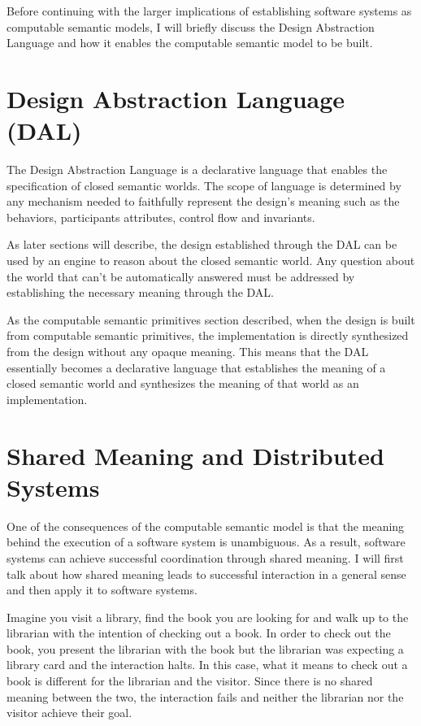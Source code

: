 \documentclass{article}
\begin{document}
Before continuing with the larger implications of establishing software systems as computable semantic models, I will briefly discuss the Design Abstraction Language and how it enables the computable semantic model to be built.

\section{Design Abstraction Language (DAL)}

The Design Abstraction Language is a declarative language that enables the specification of closed semantic worlds. The scope of language is determined by any mechanism needed to faithfully represent the design's meaning such as the behaviors, participants attributes, control flow and invariants.

As later sections will describe, the design established through the DAL can be used by an engine to reason about the closed semantic world. Any question about the world that can’t be automatically answered must be addressed by establishing the necessary meaning through the DAL.

As the computable semantic primitives section described, when the design is built from computable semantic primitives, the implementation is directly synthesized from the design without any opaque meaning. This means that the DAL essentially becomes a declarative language that establishes the meaning of a closed semantic world and synthesizes the meaning of that world as an implementation.

\section{Shared Meaning and Distributed Systems}

One of the consequences of the computable semantic model is that the meaning behind the execution of a software system is unambiguous. As a result, software systems can achieve successful coordination through shared meaning. I will first talk about how shared meaning leads to successful interaction in a general sense and then apply it to software systems.

Imagine you visit a library, find the book you are looking for and walk up to the librarian with the intention of checking out a book. In order to check out the book, you present the librarian with the book but the librarian was expecting a library card and the interaction halts. In this case, what it means to check out a book is different for the librarian and the visitor. Since there is no shared meaning between the two, the interaction fails and neither the librarian nor the visitor achieve their goal.
\end{document}
